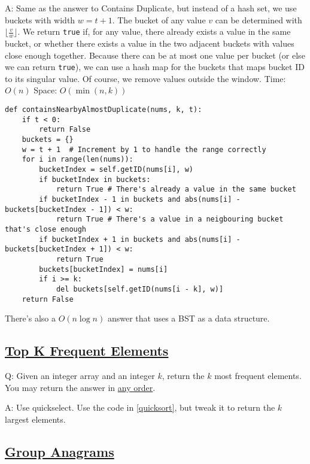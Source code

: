 \documentclass[8pt, table, xcdraw]{article}%
\begin{document}
A: Same as the answer to Contains Duplicate, but instead of a hash set, we use buckets with width $w = t + 1$. The bucket of any value $v$ can be determined with $\lfloor \frac{v}{w} \rfloor$. We return \lstinline{true} if, for any value, there already exists a value in the same bucket, or whether there exists a value in the two adjacent buckets with values close enough together. Because there can be at most one value per bucket (or else we can return \lstinline{true}), we can use a hash map for the buckets that maps bucket ID to its singular value. Of course, we remove values outside the window. Time: $O(n)$ Space: $O(\min(n,k))$

\begin{lstlisting}
def containsNearbyAlmostDuplicate(nums, k, t):
    if t < 0:
        return False
    buckets = {}
    w = t + 1  # Increment by 1 to handle the range correctly
    for i in range(len(nums)):
        bucketIndex = self.getID(nums[i], w)
        if bucketIndex in buckets:
            return True # There's already a value in the same bucket
        if bucketIndex - 1 in buckets and abs(nums[i] - buckets[bucketIndex - 1]) < w:
            return True # There's a value in a neigbouring bucket that's close enough
        if bucketIndex + 1 in buckets and abs(nums[i] - buckets[bucketIndex + 1]) < w:
            return True
        buckets[bucketIndex] = nums[i]
        if i >= k:
            del buckets[self.getID(nums[i - k], w)]
    return False
\end{lstlisting}

There's also a $O(n \log n)$ answer that uses a BST as a data structure.

\subsection{\href{https://leetcode.com/problems/top-k-frequent-elements}{Top K Frequent Elements}}

Q: Given an integer array and an integer $k$, return the $k$ most frequent elements. You may return the answer in \underline{any order}.

A: Use quickselect. Use the code in \ref{quicksort}, but tweak it to return the $k$ largest elements.

\subsection{\href{https://leetcode.com/problems/group-anagrams}{Group Anagrams}}
\end{document}
